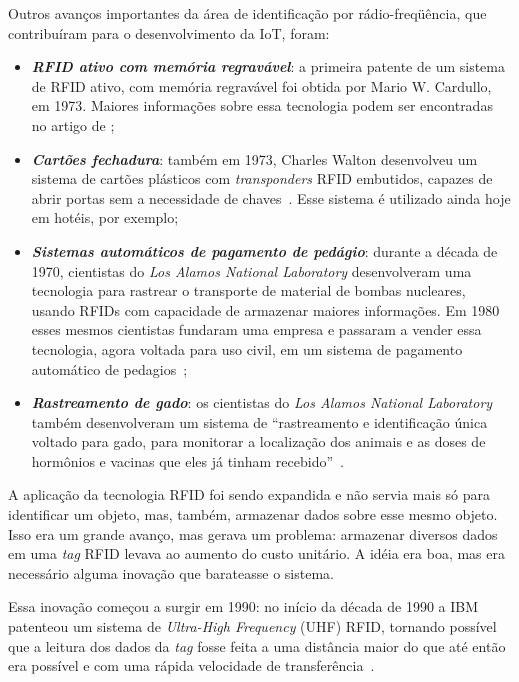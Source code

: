 \documentclass[pdftex, brazil, 12pt, twoside]{article}
\newcommand{\ingles}[1]{\textit{#1}}
\begin{document}
Outros avanços importantes da área de identificação por rádio-freqüência, que
contribuíram para o desenvolvimento da IoT, foram:

\begin{itemize}
\item \emph{\textbf{RFID ativo com memória regravável}}: a primeira patente de um sistema de RFID ativo,
  com memória regravável foi obtida por Mario W. Cardullo, em 1973. Maiores informações
  sobre essa tecnologia podem ser encontradas no artigo de \citet{CardulloRFIDGenesis2003};
\item \emph{\textbf{Cartões fechadura}}: também em 1973, Charles Walton desenvolveu um sistema
  de cartões plásticos com \ingles{transponders} RFID embutidos, capazes de abrir
  portas sem a necessidade de chaves~\citep{IEEEIoTDefinition}. Esse sistema é
  utilizado ainda hoje em hotéis, por exemplo;
\item \emph{\textbf{Sistemas automáticos de pagamento de pedágio}}: durante a década de 1970,
  cientistas do \emph{Los Alamos National Laboratory} desenvolveram uma tecnologia
  para rastrear o transporte de material de bombas nucleares, usando RFIDs com
  capacidade de armazenar maiores informações. Em 1980 esses mesmos cientistas
  fundaram uma empresa e passaram a vender essa tecnologia, agora voltada
  para uso civil, em um sistema de pagamento automático de pedagios~\citep{IEEEIoTDefinition};
\item \emph{\textbf{Rastreamento de gado}}: os cientistas do \emph{Los Alamos National Laboratory}
  também desenvolveram um sistema de ``rastreamento e identificação única voltado
  para gado, para monitorar a localização dos animais e as doses de hormônios e
  vacinas que eles já tinham recebido''~\citep[][p.\ 8--9]{IEEEIoTDefinition}.
\end{itemize}

A aplicação da tecnologia RFID foi sendo
expandida e não servia mais só para identificar um objeto, mas, também, armazenar
dados sobre esse mesmo objeto. Isso era um grande avanço, mas gerava um problema:
armazenar diversos dados em uma \ingles{tag} RFID levava ao aumento do custo
unitário. A idéia era boa, mas era necessário alguma inovação que barateasse o
sistema.

Essa inovação começou a surgir em 1990: no início da década de 1990
a IBM patenteou um sistema de \emph{Ultra-High Frequency} (UHF) RFID, tornando
possível que a leitura dos dados da \emph{tag} fosse feita a uma distância maior
do que até então era possível e com uma rápida velocidade de
transferência~\citep{IEEEIoTDefinition}.
\end{document}
